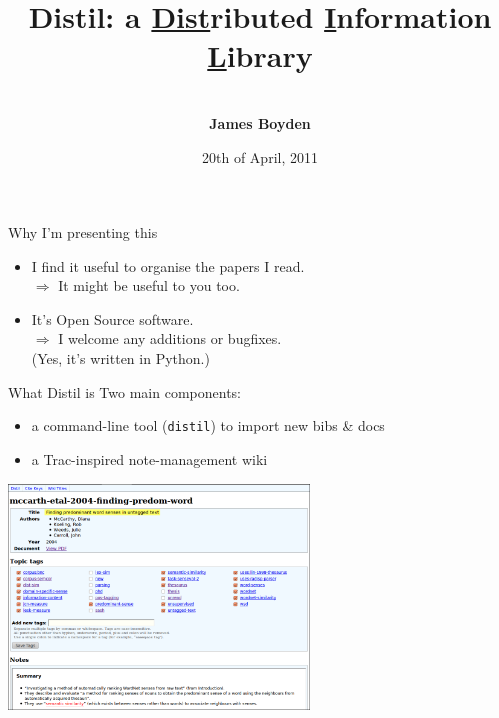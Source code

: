 \documentclass[sansserif]{beamer}
\title[Distil \hspace{24.8em}]
{Distil: a \underline{Dist}ributed \underline{I}nformation \underline{L}ibrary
\\\vspace{1em}{\small a document, bibliography, and research knowledge
management system, built on top of Git}}
\author[James Boyden]
{\\{\large \textbf{James Boyden}}}
\date{{\tiny 20th of April, 2011}}
\begin{document}
\begin{frame}
	\titlepage
\end{frame}

\begin{frame}{Why I'm presenting this}
	\begin{itemize}
		\item I find it useful to organise the papers I read.
		\\ \hspace{2em} $\Rightarrow$ It might be useful to you too. \vspace{1em}
		\item It's Open Source software.
		\\ \hspace{2em} $\Rightarrow$ I welcome any additions or bugfixes.
		\\ \hspace{5.5em} (Yes, it's written in Python.)
	\end{itemize}
\end{frame}

\begin{frame}{What Distil is}
	Two main components:
	\begin{itemize}
		\item a command-line tool ({\tt distil}) to import new bibs \& docs
		\item a Trac-inspired note-management wiki
	\end{itemize}

	\begin{center}
		\includegraphics[width=8cm]{screenshot.png}
	\end{center}
\end{frame}
\end{document}
